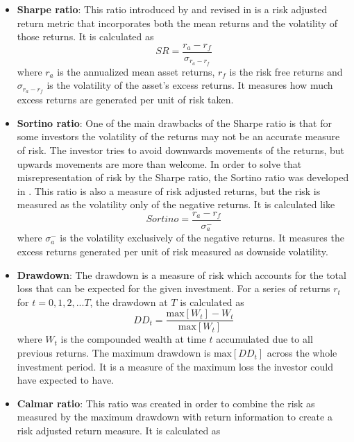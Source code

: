 \begin{itemize}
    \item \textbf{Sharpe ratio}: This ratio introduced by \cite{sharpe_1966} and revised in \cite{sharpe_1994} is a risk adjusted return metric that incorporates both the mean returns and the volatility of those returns. It is calculated as 
    \begin{equation}
        SR=\frac{r_a-r_f}{\sigma_{r_a-r_f}}
    \end{equation}
    where $r_a$ is the annualized mean asset returns, $r_f$ is the risk free returns and $\sigma_{r_a-r_f}$ is the volatility of the asset's excess returns. 
    It measures how much excess returns are generated per unit of risk taken.
    \item \textbf{Sortino ratio}: One of the main drawbacks of the Sharpe ratio is that for some investors the volatility of the returns may not be an accurate measure of risk. The investor tries to avoid downwards movements of the returns, but upwards movements are more than welcome. In order to solve that misrepresentation of risk by the Sharpe ratio, the Sortino ratio was developed in \cite{sortino_1994}. This ratio is also a measure of risk adjusted returns, but the risk is measured as the volatility only of the negative returns. It is calculated like
    \begin{equation}
        Sortino=\frac{r_a-r_f}{\sigma^-_a}
    \end{equation}
    where $\sigma_a^-$ is the volatility exclusively of the negative returns. 
    It measures the excess returns generated per unit of risk measured as downside volatility. 
    \item \textbf{Drawdown}: The drawdown is a measure of risk which accounts for the total loss that can be expected for the given investment. For a series of returns $r_t$ for $t=0,1,2,...T$, the drawdown at $T$ is calculated as 
    \begin{equation}
        DD_t=\frac{\text{max}\left[W_t\right]-W_t}{\text{max}\left[W_t\right]}
    \end{equation}
    where $W_t$ is the compounded wealth at time $t$ accumulated due to all previous returns. The maximum drawdown is $\text{max}\left[DD_t\right]$ across the whole investment period. It is a measure of the maximum loss the investor could have expected to have.
    \item \textbf{Calmar ratio}: This ratio was created in order to combine the risk as measured by the maximum drawdown with return information to create a risk adjusted return measure. It is calculated as 

\end{itemize}

